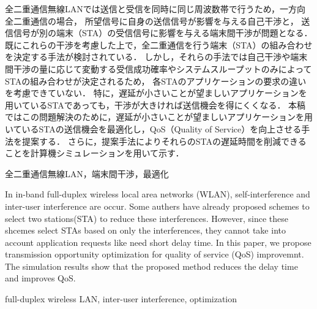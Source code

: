 \documentclass[technicalreport]{ieicej}
\begin{document}
\begin{jabstract}
	全二重通信無線LANでは送信と受信を同時に同じ周波数帯で行うため，一方向全二重通信の場合，
	所望信号に自身の送信信号が影響を与える自己干渉と，
	送信信号が別の端末（STA）の受信信号に影響を与える端末間干渉が問題となる．
	既にこれらの干渉を考慮した上で，全二重通信を行う端末（STA）の組み合わせを決定する手法が検討されている．
	しかし，それらの手法では自己干渉や端末間干渉の量に応じて変動する受信成功確率やシステムスループットのみによってSTAの組み合わせが決定されるため，
	各STAのアプリケーションの要求の違いを考慮できていない．
	特に，遅延が小さいことが望ましいアプリケーションを用いているSTAであっても，干渉が大きければ送信機会を得にくくなる．
	本稿ではこの問題解決のために，遅延が小さいことが望ましいアプリケーションを用いているSTAの送信機会を最適化し，QoS（Quality of Service）を向上させる手法を提案する．
	さらに，提案手法によりそれらのSTAの遅延時間を削減できることを計算機シミュレーションを用いて示す．
\end{jabstract}
\begin{jkeyword}
全二重通信無線LAN，端末間干渉，最適化
\end{jkeyword}
\begin{eabstract}
	In in-band full-duplex wireless local area networks (WLAN), self-interference and inter-user interference are occur.
	Some authers have already proposed schemes to select two stations(STA) to reduce these interferences.
	However, since these shcemes select STAs based on only the interferences, they cannot take into account application requests like need short delay time.
	In this paper, we propose transmission opportunity optimization for quality of service (QoS) improvemnt.
	The simulation results show that the proposed method reduces the delay time and improves QoS.
	\newline
	\newline
	\newline
	\newline
	\newline
\end{eabstract}
\begin{ekeyword}
full-duplex wireless LAN, inter-user interference, optimization
\end{ekeyword}

\maketitle
\end{document}
